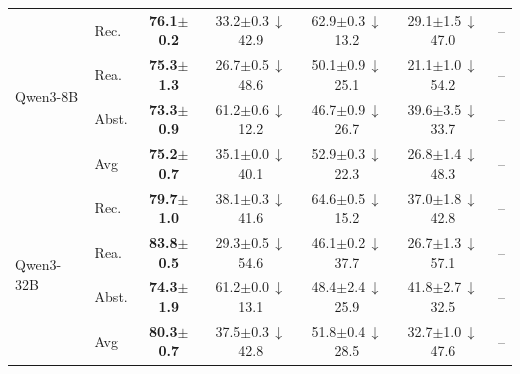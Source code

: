 \begin{table}[t]
\begin{tabular}{@{}ll c c c c c @{}}
\midrule
\multirow{4}{*}{Qwen3-8B} & Rec. & \textbf{76.1{\scriptsize$\pm$0.2}} & 33.2{\scriptsize$\pm$0.3}\,{\tiny\textcolor{red!70!black}{$\downarrow$42.9}} & 62.9{\scriptsize$\pm$0.3}\,{\tiny\textcolor{red!70!black}{$\downarrow$13.2}} & 29.1{\scriptsize$\pm$1.5}\,{\tiny\textcolor{red!70!black}{$\downarrow$47.0}} & -- \\
 & Rea. & \textbf{75.3{\scriptsize$\pm$1.3}} & 26.7{\scriptsize$\pm$0.5}\,{\tiny\textcolor{red!70!black}{$\downarrow$48.6}} & 50.1{\scriptsize$\pm$0.9}\,{\tiny\textcolor{red!70!black}{$\downarrow$25.1}} & 21.1{\scriptsize$\pm$1.0}\,{\tiny\textcolor{red!70!black}{$\downarrow$54.2}} & -- \\
 & Abst. & \textbf{73.3{\scriptsize$\pm$0.9}} & 61.2{\scriptsize$\pm$0.6}\,{\tiny\textcolor{red!70!black}{$\downarrow$12.2}} & 46.7{\scriptsize$\pm$0.9}\,{\tiny\textcolor{red!70!black}{$\downarrow$26.7}} & 39.6{\scriptsize$\pm$3.5}\,{\tiny\textcolor{red!70!black}{$\downarrow$33.7}} & -- \\
 & Avg & \textbf{75.2{\scriptsize$\pm$0.7}} & 35.1{\scriptsize$\pm$0.0}\,{\tiny\textcolor{red!70!black}{$\downarrow$40.1}} & 52.9{\scriptsize$\pm$0.3}\,{\tiny\textcolor{red!70!black}{$\downarrow$22.3}} & 26.8{\scriptsize$\pm$1.4}\,{\tiny\textcolor{red!70!black}{$\downarrow$48.3}} & -- \\
\midrule
\multirow{4}{*}{Qwen3-32B} & Rec. & \textbf{79.7{\scriptsize$\pm$1.0}} & 38.1{\scriptsize$\pm$0.3}\,{\tiny\textcolor{red!70!black}{$\downarrow$41.6}} & 64.6{\scriptsize$\pm$0.5}\,{\tiny\textcolor{red!70!black}{$\downarrow$15.2}} & 37.0{\scriptsize$\pm$1.8}\,{\tiny\textcolor{red!70!black}{$\downarrow$42.8}} & -- \\
 & Rea. & \textbf{83.8{\scriptsize$\pm$0.5}} & 29.3{\scriptsize$\pm$0.5}\,{\tiny\textcolor{red!70!black}{$\downarrow$54.6}} & 46.1{\scriptsize$\pm$0.2}\,{\tiny\textcolor{red!70!black}{$\downarrow$37.7}} & 26.7{\scriptsize$\pm$1.3}\,{\tiny\textcolor{red!70!black}{$\downarrow$57.1}} & -- \\
 & Abst. & \textbf{74.3{\scriptsize$\pm$1.9}} & 61.2{\scriptsize$\pm$0.0}\,{\tiny\textcolor{red!70!black}{$\downarrow$13.1}} & 48.4{\scriptsize$\pm$2.4}\,{\tiny\textcolor{red!70!black}{$\downarrow$25.9}} & 41.8{\scriptsize$\pm$2.7}\,{\tiny\textcolor{red!70!black}{$\downarrow$32.5}} & -- \\
 & Avg & \textbf{80.3{\scriptsize$\pm$0.7}} & 37.5{\scriptsize$\pm$0.3}\,{\tiny\textcolor{red!70!black}{$\downarrow$42.8}} & 51.8{\scriptsize$\pm$0.4}\,{\tiny\textcolor{red!70!black}{$\downarrow$28.5}} & 32.7{\scriptsize$\pm$1.0}\,{\tiny\textcolor{red!70!black}{$\downarrow$47.6}} & -- \\
\bottomrule
\end{tabular}
\vspace{-6pt}
\end{table}
